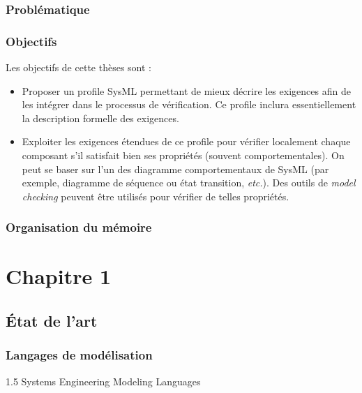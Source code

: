 \documentclass[french]{spimufcphdthesis}
\begin{document}
\section{Problématique}

\section{Objectifs}
Les objectifs de cette thèses sont :
\begin{itemize}
\item Proposer un profile SysML permettant de mieux décrire les exigences afin de les intégrer dans le processus de vérification. Ce profile inclura essentiellement la description formelle des exigences.
\item Exploiter les exigences étendues de ce profile pour vérifier localement  chaque composant s'il satisfait bien ses propriétés (souvent comportementales). On peut se baser sur l'un des diagramme comportementaux de SysML (par exemple, diagramme de séquence ou état transition, \emph{etc.}). Des outils de \textit{model checking} peuvent être utilisés pour vérifier de telles propriétés.
\end{itemize}

\section{Organisation du mémoire}


\part{Chapitre 1}

\chapter{État de l'art}



\section{Langages de modélisation}
1.5 Systems Engineering Modeling Languages
\end{document}
